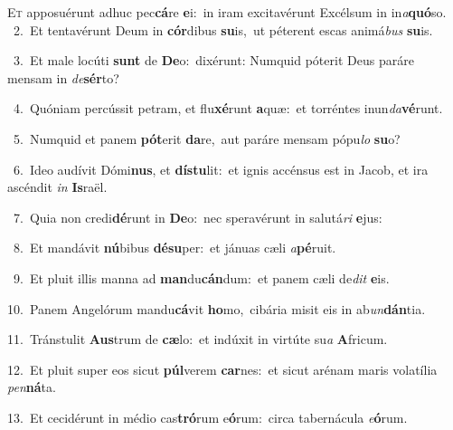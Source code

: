 \lettrine{\initial\textcolor{\initialcolor}{E}}{t} apposuérunt adhuc pec\-\textbf{cá}\-re \textbf{e}\-i:~\star in iram excitavérunt Excélsum in in\-\textit{a}\-\textbf{quó}so.\\
{\numbfont\textcolor{\numbcolor}{~2.}}~Et tentavérunt Deum in \textbf{cór}\-dibus \textbf{su}\-is,~\star ut péterent escas animá\textit{bus} \textbf{su}\-is.\par
{\numbfont\textcolor{\numbcolor}{~3.}}~Et male locúti \textbf{sunt} de \textbf{De}\-o:~\star dixérunt: Numquid póterit Deus paráre mensam in \textit{de}\-\textbf{sér}to?\par
{\numbfont\textcolor{\numbcolor}{~4.}}~Quóniam percússit petram, et flu\-\textbf{xé}\-runt \textbf{a}\-quæ:~\star et torréntes inun\-\textit{da}\-\textbf{vé}runt.\par
{\numbfont\textcolor{\numbcolor}{~5.}}~Numquid et panem \textbf{pót}\-erit \textbf{da}\-re,~\star aut paráre mensam pópu\textit{lo} \textbf{su}\-o?\par
{\numbfont\textcolor{\numbcolor}{~6.}}~Ideo audívit Dómi\-\textbf{nus}\-, et \textbf{dís}\-\textbf{tu}lit:~\star et ignis accénsus est in Jacob, et ira ascéndit \textit{in} \textbf{Is}\-raël.\par
{\numbfont\textcolor{\numbcolor}{~7.}}~Quia non credi\-\textbf{dé}\-runt in \textbf{De}\-o:~\star nec speravérunt in salutá\textit{ri} \textbf{e}\-jus:\par
{\numbfont\textcolor{\numbcolor}{~8.}}~Et mandávit \textbf{nú}\-bibus \textbf{dé}\-\textbf{su}per:~\star et jánuas cæli \textit{a}\-\textbf{pé}ruit.\par
{\numbfont\textcolor{\numbcolor}{~9.}}~Et pluit illis manna ad \textbf{man}\-du\-\textbf{cán}\-dum:~\star et panem cæli de\textit{dit} \textbf{e}\-is.\par
{\numbfont\textcolor{\numbcolor}{10.}}~Panem Angelórum mandu\-\textbf{cá}\-vit \textbf{ho}\-mo,~\star cibária misit eis in ab\-\textit{un}\-\textbf{dán}tia.\par
{\numbfont\textcolor{\numbcolor}{11.}}~Tránstulit \textbf{Aus}\-trum de \textbf{cæ}\-lo:~\star et indúxit in virtúte su\textit{a} \textbf{A}\-fricum.\par
{\numbfont\textcolor{\numbcolor}{12.}}~Et pluit super eos sicut \textbf{púl}\-verem \textbf{car}\-nes:~\star et sicut arénam maris volatília \textit{pen}\-\textbf{ná}ta.\par
{\numbfont\textcolor{\numbcolor}{13.}}~Et cecidérunt in médio cas\-\textbf{tró}\-rum e\-\textbf{ó}\-rum:~\star circa tabernácula \textit{e}\-\textbf{ó}rum.\par
